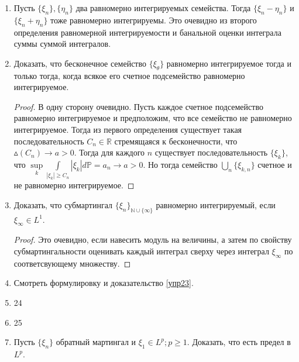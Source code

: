 \documentclass[12pt,a4paper]{article} %
\newcommand{\R}{\mathbb{R}}
\newcommand{\E}{\mathbb{E}}
\newcommand{\PR}{\mathbb{P}}
\begin{document}
\begin{enumerate}
		\begin{proof}
			Из ограниченности мат. ожидания получаем, что для $\forall\varepsilon>0\,\exists A>0$, что $\frac{1}{A}\sup\limits_{\theta}\E\varphi(|\xi_{\theta}|)<\varepsilon$. Из роста функции получаем, что для данного $A$ найдется $M_A$, что для любого $x>M_A$ выполняется $\varphi(x)>Ax$. Тогда получаем требуеомое:
			$$\sup\limits_{\theta}\int\limits_{|\xi_{\theta}|>M_A}|\xi_{\theta}|d\PR<\frac{1}{A}\sup\limits_{\theta}\int\limits_{|\xi_{\theta}|>M_A}\varphi(|\xi_{\theta}|)d\PR<\varepsilon$$
		\end{proof}
		\item Пусть $\{\xi_n\},\{\eta_n\}$ два равномерно интегрируемых семейства. Тогда $\{\xi_n-\eta_n\}$ и\\ $\{\xi_n+\eta_n\}$ тоже равномерно интегрируемы. Это очевидно из второго определения равномерной интегрируемости и банальной оценки интеграла суммы суммой интегралов.
		\item Доказать, что бесконечное семейство $\{\xi_{\theta}\}$ равномерно интегрируемое тогда и только тогда, когда всякое его счетное подсемейство равномерно интегрируемое.
		\begin{proof}
			В одну сторону очевидно. Пусть каждое счетное подсемейство равномерно интегрируемое и предположим, что все семейство не равномерно интегрируемое. Тогда из первого определения существует такая последовательность $C_n\in\R$ стремящаяся к бесконечности, что $\vartriangle(C_n)\rightarrow a>0$. Тогда для каждого $n$ существует последовательность $\{\xi_k\}$, что $\sup\limits_k\int\limits_{|\xi_k|\geq C_n}|\xi_k|d\PR=a_n\rightarrow a>0$. Но тогда семейство $\bigcup\limits_n\{\xi_{k,n}\}$ счетное и не равномерно интегрируемое.
		\end{proof}
		\item Доказать, что субмартингал $\{\xi_n\}_{\mathbb{N}\cup\{\infty\}}$ равномерно интегрируемый, если $\xi_{\infty}\in L^1$.
		\begin{proof}
			Это очевидно, если навесить модуль на величины, а затем по свойству субмартингальности оценивать каждый интеграл сверху через интеграл $\xi_{\infty}$ по соответсвующему множеству.
		\end{proof}
		\item Смотреть формулировку и доказательство \eqref{упр23}.
		\item 24
		\item 25
		\item Пусть $\{\xi_n\}$ обратный мартингал и $\xi_1\in L^p;p\geq1$. Доказать, что есть предел в $L^p$.

\end{enumerate}
\end{document}

